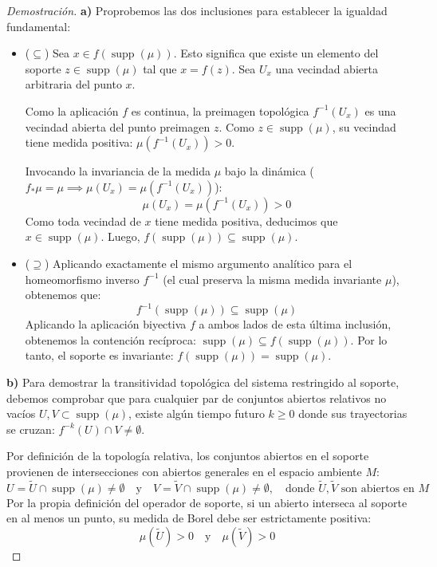 \begin{proof}[Demostración]
	\textbf{a)} Proprobemos las dos inclusiones para establecer la igualdad fundamental:
	\begin{itemize}
		\item ($\subseteq$) Sea $x \in f(\operatorname{supp}(\mu))$. Esto significa que existe un elemento del soporte $z \in \operatorname{supp}(\mu)$ tal que $x = f(z)$. Sea $U_x$ una vecindad abierta arbitraria del punto $x$. 
		
		Como la aplicación $f$ es continua, la preimagen topológica $f^{-1}(U_x)$ es una vecindad abierta del punto preimagen $z$. Como $z \in \operatorname{supp}(\mu)$, su vecindad tiene medida positiva: $\mu(f^{-1}(U_x)) > 0$.
		
		Invocando la invariancia de la medida $\mu$ bajo la dinámica ($f_* \mu = \mu \implies \mu(U_x) = \mu(f^{-1}(U_x))$):
		$$ \mu(U_x) = \mu(f^{-1}(U_x)) > 0 $$
		Como toda vecindad de $x$ tiene medida positiva, deducimos que $x \in \operatorname{supp}(\mu)$. Luego, $f(\operatorname{supp}(\mu)) \subseteq \operatorname{supp}(\mu)$.
		
		\item ($\supseteq$) Aplicando exactamente el mismo argumento analítico para el homeomorfismo inverso $f^{-1}$ (el cual preserva la misma medida invariante $\mu$), obtenemos que:
		$$ f^{-1}(\operatorname{supp}(\mu)) \subseteq \operatorname{supp}(\mu) $$
		Aplicando la aplicación biyectiva $f$ a ambos lados de esta última inclusión, obtenemos la contención recíproca: $\operatorname{supp}(\mu) \subseteq f(\operatorname{supp}(\mu))$. Por lo tanto, el soporte es invariante: $f(\operatorname{supp}(\mu)) = \operatorname{supp}(\mu)$.
	\end{itemize}
	
	\textbf{b)} Para demostrar la transitividad topológica del sistema restringido al soporte, debemos comprobar que para cualquier par de conjuntos abiertos relativos no vacíos $U, V \subset \operatorname{supp}(\mu)$, existe algún tiempo futuro $k \ge 0$ donde sus trayectorias se cruzan: $f^{-k}(U) \cap V \neq \emptyset$.
	
	Por definición de la topología relativa, los conjuntos abiertos en el soporte provienen de intersecciones con abiertos generales en el espacio ambiente $M$:
	$$ U = \tilde{U} \cap \operatorname{supp}(\mu) \neq \emptyset \quad \text{y} \quad V = \tilde{V} \cap \operatorname{supp}(\mu) \neq \emptyset, \quad \text{donde } \tilde{U}, \tilde{V} \text{ son abiertos en } M $$
	Por la propia definición del operador de soporte, si un abierto interseca al soporte en al menos un punto, su medida de Borel debe ser estrictamente positiva:
	$$ \mu(\tilde{U}) > 0 \quad \text{y} \quad \mu(\tilde{V}) > 0 $$
	

\end{proof}
